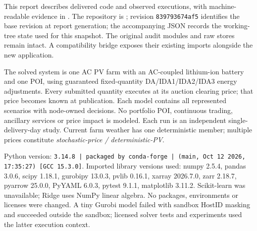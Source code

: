 \documentclass[11pt,a4paper]{article}
\begin{document}
This report describes delivered code and observed executions, with machine-readable
evidence in . The repository is
; revision \texttt{839793674af5}
identifies the base revision at report generation; the accompanying JSON records
the working-tree state used for this snapshot. The original audit modules and raw
stores remain intact. A compatibility
bridge exposes their existing imports alongside the new  application.

The solved system is one AC PV farm with an AC-coupled lithium-ion battery and one
POI, using guaranteed fixed-quantity DA/IDA1/IDA2/IDA3 energy adjustments. Every
submitted quantity executes at its auction clearing price; that price becomes
known at publication. Each model
contains all represented scenarios with node-owned decisions. No portfolio POI,
continuous trading, ancillary services or price impact is modeled. Each run is an
independent single-delivery-day study. Current farm weather has one deterministic
member; multiple prices constitute \emph{stochastic-price / deterministic-PV}.

Python version: \texttt{3.14.8 | packaged by conda-forge | (main, Oct 12 2026, 17:35:27) [GCC 15.3.0]}.
Imported library versions used: numpy 2.5.4, pandas 3.0.6, scipy 1.18.1, gurobipy 13.0.3, pvlib 0.16.1, xarray 2026.7.0, zarr 2.18.7, pyarrow 25.0.0, PyYAML 6.0.3, pytest 9.1.1, matplotlib 3.11.2. Scikit-learn was unavailable; Ridge uses
NumPy linear algebra. No packages, environments or licenses were changed. A tiny
Gurobi model failed with sandbox HostID masking and succeeded outside the sandbox;
licensed solver tests and experiments used the latter execution context.
\end{document}
